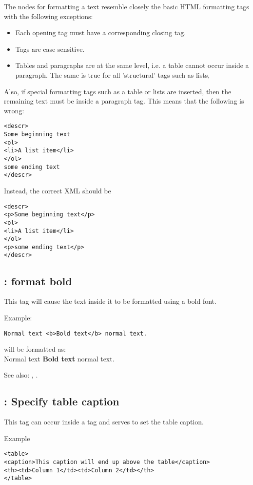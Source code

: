 The nodes for formatting a text resemble closely the basic HTML formatting tags with the 
following exceptions:
\begin{itemize}
\item Each opening tag must have a corresponding closing tag.
\item Tags are case sensitive. 
\item Tables and paragraphs are at the same level, i.e. a table cannot occur
inside a paragraph. The same is true for all 'structural' tags such as
lists, 
\end{itemize}

Also, if special formatting tags such as a table or lists are inserted, then
the remaining text must be inside a paragraph tag. This means that the
following is wrong:
\begin{verbatim}
<descr>
Some beginning text
<ol>
<li>A list item</li>
</ol>
some ending text
</descr>
\end{verbatim}
Instead, the correct XML should be
\begin{verbatim}
<descr>
<p>Some beginning text</p>
<ol>
<li>A list item</li>
</ol>
<p>some ending text</p>
</descr>
\end{verbatim}

\subsection{ : format bold}
\label{tag:b}
This tag will cause the text inside it to be formatted using a bold font.

Example:
\begin{verbatim}
Normal text <b>Bold text</b> normal text.
\end{verbatim}
will be formatted as:\\
Normal text \textbf{Bold text} normal text.

See also: , .

\subsection{ : Specify table caption}
\label{tag:caption}
This tag can occur inside a  tag and serves to set the table 
caption.

Example
\begin{verbatim}
<table>
<caption>This caption will end up above the table</caption>
<th><td>Column 1</td><td>Column 2</td></th>
</table>
\end{verbatim}

